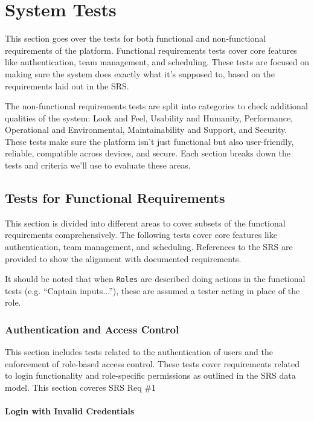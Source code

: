 \documentclass[12pt, titlepage]{article}
\begin{document}
\section{System Tests}

This section goes over the tests for both functional and non-functional requirements of the platform. Functional requirements tests cover core features like authentication, team management, and scheduling. These tests are focused on making sure the system does exactly what it’s supposed to, based on the requirements laid out in the SRS.

The non-functional requirements tests are split into categories to check additional qualities of the system: Look and Feel, Usability and Humanity, Performance, Operational and Environmental, Maintainability and Support, and Security. These tests make sure the platform isn’t just functional but also user-friendly, reliable, compatible across devices, and secure. Each section breaks down the tests and criteria we’ll use to evaluate these areas.

\subsection{Tests for Functional Requirements}

This section is divided into different areas to cover subsets of the functional requirements comprehensively. The following tests cover core features like authentication, team management, and scheduling. References to the SRS are provided to show the alignment with documented requirements.

It should be noted that when \texttt{Roles} are described doing actions in the functional tests (e.g. ``Captain inputs...''), these are assumed a tester acting in place of the role. 

\subsubsection{Authentication and Access Control}

This section includes tests related to the authentication of users and the enforcement of role-based access control. These tests cover requirements related to login functionality and role-specific permissions as outlined in the SRS data model. This section coveres SRS Req \#1

\paragraph{Login with Invalid Credentials}
\end{document}
